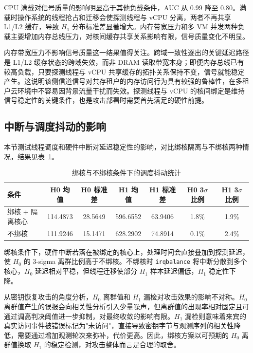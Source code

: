 CPU 满载对信号质量的影响明显高于其他负载条件，AUC 从 0.99 降至 0.80。满载时操作系统的线程抢占和迁移会使探测线程与 vCPU 分离，两者不再共享 L1/L2 缓存，导致 $H_1$ 分布标准差显著增大。内存带宽压力和多 VM 并发两种负载主要增加内存总线压力，对核间缓存共享关系影响有限，信号质量变化不明显。

内存带宽压力不影响信号质量这一结果值得关注。跨域一致性逐出的关键延迟路径是 L1/L2 缓存状态的跨域失效，而非 DRAM 读取带宽本身；即便内存总线已有较高负载，只要探测线程与 vCPU 共享缓存的拓扑关系保持不变，信号就能稳定产生。这说明该侧信道信号对共存租户的内存访问行为具有较强的鲁棒性，在多租户云环境中不容易因背景流量干扰而失效。探测线程与 vCPU 的核间绑定是维持信号稳定性的关键条件，也是攻击部署时需要首先满足的硬性前提。

\subsection{中断与调度抖动的影响}

本节测试线程调度和硬件中断对延迟稳定性的影响，对比绑核隔离与不绑核两种情况，结果见表~\ref{tab:sched_jitter_43b}。

\begin{table}[htbp]
  \centering
  \renewcommand{\arraystretch}{1.2}
  \caption{绑核与不绑核条件下的调度抖动统计}
  \label{tab:sched_jitter_43b}
  \setlength{\tabcolsep}{6pt}
  \begin{tabular}{lcccccc}
    \hline
    条件 & H0 均值 & H0 标准差 & H1 均值 & H1 标准差 & H0 3$\sigma$ 比例 & H1 3$\sigma$ 比例 \\
    \hline
    绑核 + 隔离核心 & 114.4873 & 28.5649 & 596.6552 & 63.9406 & 1.8\% & 1.9\% \\
    不绑核 & 111.9246 & 15.1471 & 628.2902 & 74.8914 & 0.1\% & 2.4\% \\
    \hline
  \end{tabular}
\end{table}

绑核条件下，硬件中断若落在被绑定的核心上，处理时间会直接叠加到探测延迟，使 $H_0$ 的 3-sigma 离群比例高于不绑核。不绑核时 \texttt{irqbalance} 将中断分散到多个核心，$H_0$ 延迟相对平稳，但线程迁移使部分 $H_1$ 样本延迟偏低，$H_1$ 稳定性下降。

从密钥恢复攻击的角度分析，$H_0$ 离群值和 $H_1$ 漏检对攻击效果的影响不对称。$H_0$ 离群值产生的误报会向相关性分析引入少量噪声，但离群值的出现率相对固定且可通过调高判决阈值进一步抑制，对最终收敛的影响有限。$H_1$ 漏检则意味着来宾的真实访问事件被错误标记为"未访问"，直接导致密钥字节与观测序列的相关性降低，需要通过增加观测轮次来弥补，代价更高。因此，绑核方案以可预期的 $H_0$ 离群值换取 $H_1$ 的稳定检测，对攻击整体而言是合理的取舍。

